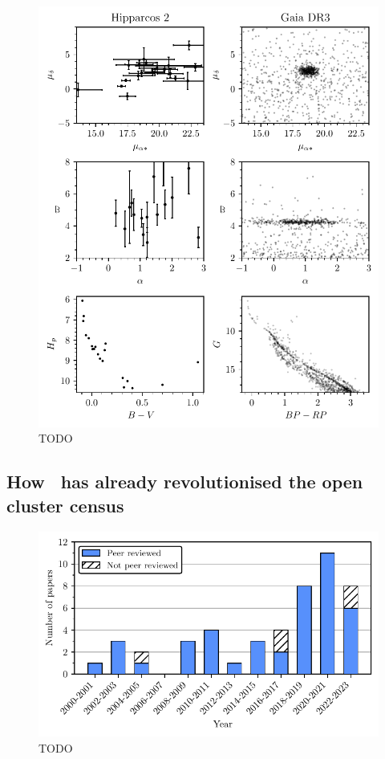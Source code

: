 \begin{figure}[tb]
	\includegraphics[width=\textwidth]{fig/c1/gaia_hipparcos_oc_comparison.pdf}
	\caption[TODO]{TODO}
	\label{fig:intro:gaia:blanco_1}
\end{figure}


\subsection{How \gaia\ has already revolutionised the open cluster census}
\label{sec:intro:gaia:census}


\begin{figure}[tb]
	\includegraphics[width=\textwidth]{fig/c1/papers.pdf}
	\caption{TODO}
	\label{fig:intro:history:papers}
\end{figure}


